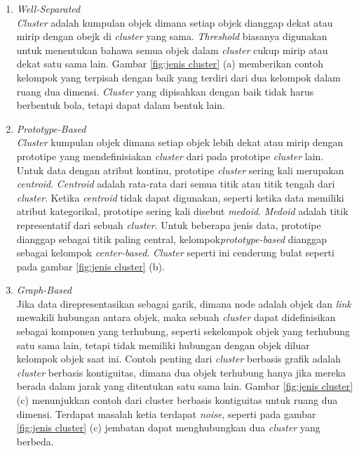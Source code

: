 \begin{enumerate}
    \item \textit{Well-Separated} \\
        \textit{Cluster} adalah kumpulan objek dimana setiap objek dianggap dekat atau mirip dengan obejk di \textit{cluster} yang sama. \textit{Threshold} biasanya digunakan untuk menentukan bahawa semua objek dalam \textit{cluster} cukup mirip atau dekat satu sama lain. Gambar \ref{fig:jenis cluster} (a) memberikan contoh kelompok yang terpisah dengan baik yang terdiri dari dua kelompok dalam ruang dua dimensi. \textit{Cluster} yang dipisahkan dengan baik tidak harus berbentuk bola, tetapi dapat dalam bentuk lain.
        
    \item \textit{Prototype-Based} \\
        \textit{Cluster} kumpulan objek dimana setiap objek lebih dekat atau mirip dengan prototipe yang mendefinisiakan \textit{cluster} dari pada prototipe \textit{cluster} lain. Untuk data dengan atribut kontinu, prototipe \textit{cluster} sering kali merupakan \textit{centroid}. \textit{Centroid} adalah rata-rata dari semua titik atau titik tengah dari \textit{cluster}. Ketika \textit{centroid} tidak dapat digunakan, seperti ketika data memiliki atribut kategorikal, prototipe sering kali disebut \textit{medoid}. \textit{Medoid} adalah titik representatif dari sebuah \textit{cluster}. Untuk beberapa jenis data, prototipe dianggap sebagai titik paling central, kelompok\textit{prototype-based} dianggap sebagai kelompok \textit{center-based}. \textit{Cluster} seperti ini cenderung bulat seperti pada gambar \ref{fig:jenis cluster} (b).
            
    \item \textit{Graph-Based}\\
        Jika data direpresentasikan sebagai garik, dimana node adalah objek dan \textit{link} mewakili hubungan antara objek, maka sebuah \textit{cluster} dapat didefinisikan sebagai komponen yang terhubung, seperti sekelompok objek yang terhubung satu sama lain, tetapi tidak memiliki hubungan dengan objek diluar kelompok objek saat ini. Contoh penting dari \textit{cluster} berbasis grafik adalah \textit{cluster} berbasis kontiguitas, dimana dua objek terhubung hanya jika mereka berada dalam jarak yang ditentukan satu sama lain. Gambar \ref{fig:jenis cluster} (c) menunjukkan contoh dari cluster berbasis kontiguitas untuk ruang dua dimensi. Terdapat masalah ketia terdapat \textit{noise}, seperti pada gambar \ref{fig:jenis cluster} (c) jembatan dapat menghubungkan dua \textit{cluster} yang berbeda.
        

\end{enumerate}

